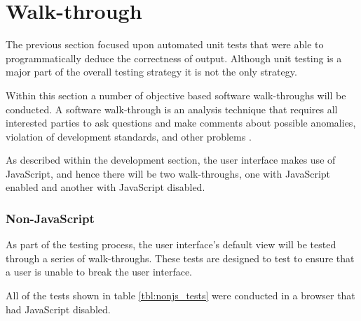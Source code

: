 \section{Walk-through}
\label{sec:walkthroughs}

The previous section focused upon automated unit tests that were able to 
programmatically deduce the correctness of output. Although unit testing is a 
major part of the overall testing strategy it is not the only strategy.

Within this section a number of objective based software walk-throughs will be 
conducted. A software walk-through is an analysis technique that requires all 
interested parties to ask questions and make comments about possible anomalies, 
violation of development standards, and other problems \citep{ieee08}.

As described within the development section, the user interface makes use of 
JavaScript, and hence there will be two walk-throughs, one with JavaScript 
enabled and another with JavaScript disabled.



\subsubsection{Non-JavaScript} %
\label{ssub:non_javascript}

As part of the testing process, the user interface's default view will be tested
through a series of walk-throughs. These tests are designed to test to ensure
that a user is unable to break the user interface.

All of the tests shown in table \ref{tbl:nonjs_tests} were conducted in a 
browser that had JavaScript disabled.

